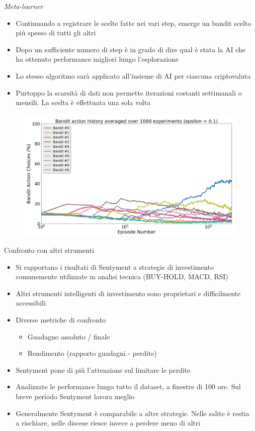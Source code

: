 \documentclass{beamer}
\begin{document}
\begin{frame}{\textit{Meta-learner}}
\begin{itemize}
\item Continuando a registrare le scelte fatte nei vari step, emerge un bandit scelto più spesso di tutti gli altri
\item Dopo un sufficiente numero di step è in grado di dire qual è stata la AI che ha ottenuto performance migliori lungo l'esplorazione
\item Lo stesso algoritmo sarà applicato all'insieme di AI per ciascuna criptovaluta
\item Purtoppo la scarsità di dati non permette iterazioni costanti settimanali o mensili. La scelta è effettuata una sola volta
\end{itemize}
\begin{figure}
        \centering
        \includegraphics[width=.5\linewidth]{bandit_choice_1000}
\end{figure}
\end{frame}

\begin{frame}{Confronto con altri strumenti}
\begin{itemize}
\item Si rapportano i risultati di Sentyment a strategie di investimento comunemente utilizzate in analisi tecnica (BUY-HOLD, MACD, RSI)
\item Altri strumenti intelligenti di investimento sono proprietari e difficilmente accessibili
\item Diverse metriche di confronto
\begin{itemize}
\item Guadagno assoluto / finale
\item Rendimento (rapporto guadagni - perdite)
\end{itemize}
\item Sentyment pone di più l'attenzione sul limitare le perdite
\item Analizzate le performance lungo tutto il dataset, a finestre di 100 ore. Sul breve periodo Sentyment lavora meglio
\item Generalmente Sentyment è comparabile a altre strategie. Nelle salite è restia a rischiare, nelle discese riesce invece a perdere meno di altri  
\end{itemize}
\end{frame}
\end{document}
